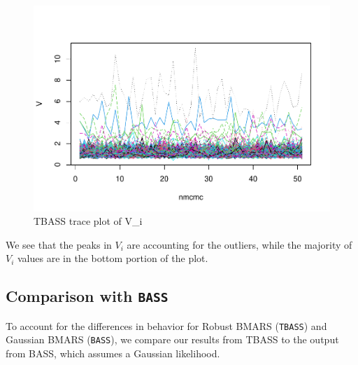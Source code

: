 \documentclass[
]{article}
\begin{document}
\begin{figure}
\centering
\includegraphics{TBASS_vig_files/figure-latex/unnamed-chunk-15-1.pdf}
\caption{TBASS trace plot of V\_i}
\end{figure}

We see that the peaks in \(V_i\) are accounting for the outliers, while
the majority of \(V_i\) values are in the bottom portion of the plot.

\hypertarget{comparison-with-bass}{%
\subsection{\texorpdfstring{Comparison with
\texttt{BASS}}{Comparison with BASS}}\label{comparison-with-bass}}

To account for the differences in behavior for Robust BMARS
(\texttt{TBASS}) and Gaussian BMARS (\texttt{BASS}), we compare our
results from TBASS to the output from BASS, which assumes a Gaussian
likelihood.
\end{document}

